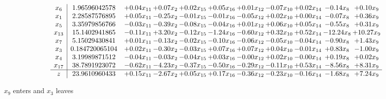 \documentclass[9pt]{article}
\begin{document}
 \[\begin{array}{c| c c@{\hskip 2pt} c@{\hskip 2pt} c@{\hskip 2pt} c@{\hskip 2pt} c@{\hskip 2pt} c@{\hskip 2pt} c@{\hskip 2pt} c@{\hskip 2pt} c@{\hskip 2pt} }
 x_{6}   &  1.96596042578 & +  0.04 x_{11} & +  0.07 x_{2} & +  0.02 x_{15} & +  0.05 x_{16} & +  0.01 x_{12} & -0.07 x_{10} & +  0.02 x_{14} & -0.14 x_{8} & +  0.10 x_{9}\\
 x_{1}   &  2.28587576895 & +  0.05 x_{11} & -0.25 x_{2} & -0.01 x_{15} & -0.01 x_{16} & -0.05 x_{12} & +  0.02 x_{10} & +  0.00 x_{14} & -0.07 x_{8} & +  0.36 x_{9}\\
 x_{5}   &  3.35979856766 & -0.03 x_{11} & -0.39 x_{2} & -0.08 x_{15} & -0.04 x_{16} & +  0.01 x_{12} & +  0.06 x_{10} & +  0.05 x_{14} & -0.55 x_{8} & +  0.31 x_{9}\\
 x_{13}   &  15.1402941865 & -0.11 x_{11} & +  3.20 x_{2} & -0.12 x_{15} & -1.24 x_{16} & -0.60 x_{12} & +  0.32 x_{10} & +  0.52 x_{14} & -12.24 x_{8} & + 10.27 x_{9}\\
 x_{7}   &  5.15029430841 & +  0.01 x_{11} & -0.13 x_{2} & -0.02 x_{15} & -0.10 x_{16} & -0.06 x_{12} & -0.05 x_{10} & -0.04 x_{14} & -0.90 x_{8} & +  1.43 x_{9}\\
 x_{3}   &  0.184720065104 & +  0.02 x_{11} & -0.30 x_{2} & -0.03 x_{15} & +  0.07 x_{16} & +  0.07 x_{12} & +  0.04 x_{10} & -0.01 x_{14} & +  0.83 x_{8} & -1.00 x_{9}\\
 x_{4}   &  3.19989871512 & -0.04 x_{11} & -0.03 x_{2} & -0.04 x_{15} & +  0.03 x_{16} & -0.00 x_{12} & +  0.02 x_{10} & -0.00 x_{14} & +  0.19 x_{8} & +  0.02 x_{9}\\
 x_{17}   &  38.7891923072 & -0.62 x_{11} & -4.23 x_{2} & -0.37 x_{15} & -0.50 x_{16} & -0.29 x_{12} & -0.11 x_{10} & +  0.53 x_{14} & -8.56 x_{8} & +  8.31 x_{9}\\
\hline
z    &  23.9610960433 & +  0.15 x_{11} & -2.67 x_{2} & +  0.05 x_{15} & +  0.17 x_{16} & -0.36 x_{12} & -0.23 x_{10} & -0.16 x_{14} & -1.68 x_{8} & +  7.24 x_{9}\\
\end{array}\]


 $ x_{9} $ enters and $ x_{3} $ leaves 
\end{document}
